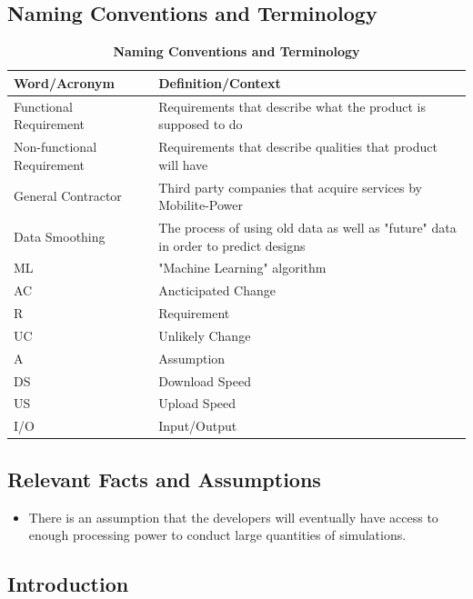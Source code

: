 \documentclass[12pt, titlepage]{article}
\begin{document}
\subsection{Naming Conventions and Terminology}

\begin{table}[htp]
\caption{\bf Naming Conventions and Terminology}
\begin{tabular}{ |p{6cm}|p{8cm}|  } 
 \hline
\bf Word/Acronym & \bf Definition/Context\\
 \hline
 Functional Requirement & Requirements that describe what the product is supposed to do\\
 \hline
Non-functional Requirement & Requirements that describe qualities that product will have\\
 \hline
General Contractor & Third party companies that acquire services by Mobilite-Power\\
 \hline
Data Smoothing & The process of using old data as well as "future" data in order to predict designs\\
 \hline
ML & "Machine Learning" algorithm\\
\hline
AC & Ancticipated Change\\
\hline 
R & Requirement\\
\hline 
UC & Unlikely Change\\
\hline 
A & Assumption\\
\hline 
DS & Download Speed\\
\hline
US & Upload Speed\\
\hline
I/O & Input/Output\\
\hline
\end{tabular}
\end{table}

\subsection{Relevant Facts and Assumptions}
\begin{itemize}
    \item There is an assumption that the developers will eventually have access to enough processing power to conduct large quantities of simulations.

\end{itemize}

\subsection{Introduction}
\end{document}
